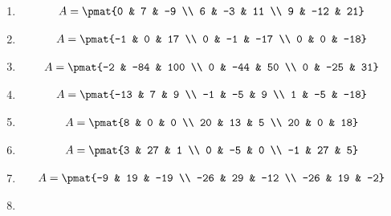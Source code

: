 \begin{enumerate}
\item

\begin{align*}
A = \pmat{0 & 7 & -9 \\ 6 & -3 & 11 \\ 9 & -12 & 21}
\end{align*}

\item

\begin{align*}
A = \pmat{-1 & 0 & 17 \\ 0 & -1 & -17 \\ 0 & 0 & -18}
\end{align*}

\item

\begin{align*}
A = \pmat{-2 & -84 & 100 \\ 0 & -44 & 50 \\ 0 & -25 & 31}
\end{align*}

\item

\begin{align*}
A = \pmat{-13 & 7 & 9 \\ -1 & -5 & 9 \\ 1 & -5 & -18}
\end{align*}

\item

\begin{align*}
A = \pmat{8 & 0 & 0 \\ 20 & 13 & 5 \\ 20 & 0 & 18}
\end{align*}

\item

\begin{align*}
A = \pmat{3 & 27 & 1 \\ 0 & -5 & 0 \\ -1 & 27 & 5}
\end{align*}

\item

\begin{align*}
A = \pmat{-9 & 19 & -19 \\ -26 & 29 & -12 \\ -26 & 19 & -2}
\end{align*}

\item


\end{enumerate}
